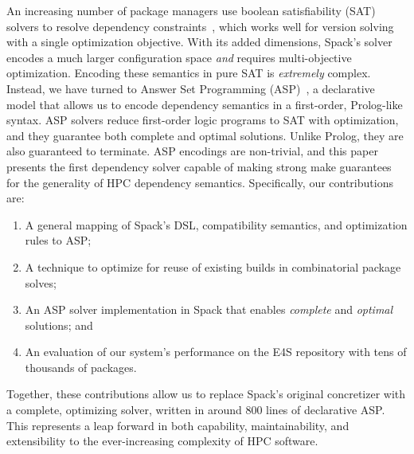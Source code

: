 An increasing number of package managers use boolean satisfiability (SAT) solvers to
resolve dependency constraints~\cite{abate2020dependency}, which works well for version
solving with a single optimization objective. With its added dimensions, Spack's solver
encodes a much larger configuration space {\it and} requires multi-objective
optimization. Encoding these semantics in pure SAT is {\it extremely} complex. Instead,
we have turned to Answer Set Programming
(ASP)~\cite{gebser+:asp-book,marek+:asp-origins}, a declarative model that allows us to
encode dependency semantics in a first-order, Prolog-like syntax. ASP solvers reduce
first-order logic programs to SAT with optimization, and they guarantee both complete
and optimal solutions. Unlike Prolog, they are also guaranteed to terminate. ASP
encodings are non-trivial, and this paper presents the first dependency solver capable
of making strong make guarantees for the generality of HPC dependency semantics.
Specifically, our contributions are:

\begin{enumerate}
\item A general mapping of Spack's DSL, compatibility semantics, and optimization rules
  to ASP;
\item A technique to optimize for reuse of existing builds in combinatorial package
  solves;
\item An ASP solver implementation in Spack that enables {\it complete} and {\it
  optimal} solutions; and
\item An evaluation of our system's performance on the E4S repository with tens of
  thousands of packages.
\end{enumerate}

Together, these contributions allow us to replace Spack's original concretizer with a
complete, optimizing solver, written in around 800 lines of declarative ASP. This
represents a leap forward in both capability, maintainability, and extensibility to the
ever-increasing complexity of HPC software.
